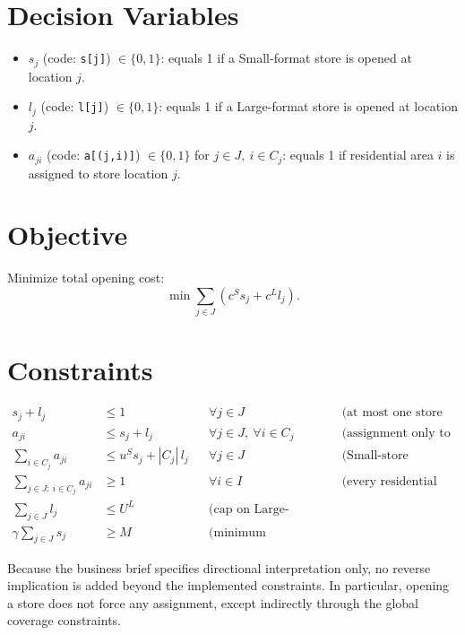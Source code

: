 \section*{Decision Variables}

\begin{itemize}
  \item $s_j$ (code: \texttt{s[j]}) $\in \{0,1\}$: equals 1 if a Small-format store is opened at location $j$.
  \item $l_j$ (code: \texttt{l[j]}) $\in \{0,1\}$: equals 1 if a Large-format store is opened at location $j$.
  \item $a_{ji}$ (code: \texttt{a[(j,i)]}) $\in \{0,1\}$ for $j \in J,\ i \in C_j$: equals 1 if residential area $i$ is assigned to store location $j$.
\end{itemize}

\section*{Objective}

Minimize total opening cost:
\[
\min \sum_{j \in J} \left(c^{S} s_j + c^{L} l_j\right).
\]

\section*{Constraints}

\begin{align}
s_j + l_j &\le 1 && \forall j \in J
&& \text{(at most one store format per location)} \\
a_{ji} &\le s_j + l_j && \forall j \in J,\ \forall i \in C_j
&& \text{(assignment only to an opened store)} \\
\sum_{i \in C_j} a_{ji} &\le u^{S} s_j + |C_j|\, l_j && \forall j \in J
&& \text{(Small-store capacity; Large uses full listed coverage size)} \\
\sum_{j \in J:\ i \in C_j} a_{ji} &\ge 1 && \forall i \in I
&& \text{(every residential area must be covered)} \\
\sum_{j \in J} l_j &\le U^{L}
&& \text{(cap on Large-format stores)} \\
\gamma \sum_{j \in J} s_j &\ge M
&& \text{(minimum neighborhood-counter promise).}
\end{align}

Because the business brief specifies directional interpretation only, no reverse implication is added beyond the implemented constraints. In particular, opening a store does not force any assignment, except indirectly through the global coverage constraints.

